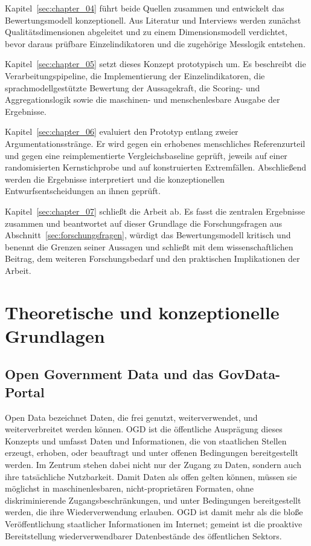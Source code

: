 Kapitel~\ref{sec:chapter_04} führt beide Quellen zusammen und entwickelt das
Bewertungsmodell konzeptionell. Aus Literatur und Interviews werden zunächst
Qualitätsdimensionen abgeleitet und zu einem Dimensionsmodell verdichtet, bevor
daraus prüfbare Einzelindikatoren und die zugehörige Messlogik entstehen.

Kapitel~\ref{sec:chapter_05} setzt dieses Konzept prototypisch um. Es beschreibt
die Verarbeitungspipeline, die Implementierung der Einzelindikatoren, die
sprachmodellgestützte Bewertung der Aussagekraft, die Scoring- und
Aggregationslogik sowie die maschinen- und menschenlesbare Ausgabe der
Ergebnisse.

Kapitel~\ref{sec:chapter_06} evaluiert den Prototyp entlang zweier
Argumentationsstränge. Er wird gegen ein erhobenes menschliches
Referenzurteil und gegen eine reimplementierte Vergleichsbaseline geprüft, jeweils
auf einer randomisierten Kernstichprobe und auf konstruierten Extremfällen.
Abschließend werden die Ergebnisse interpretiert und die konzeptionellen
Entwurfsentscheidungen an ihnen geprüft.

Kapitel~\ref{sec:chapter_07} schließt die Arbeit ab. Es fasst die zentralen
Ergebnisse zusammen und beantwortet auf dieser Grundlage die Forschungsfragen aus
Abschnitt~\ref{sec:forschungsfragen}, würdigt das Bewertungsmodell kritisch und
benennt die Grenzen seiner Aussagen und schließt mit dem wissenschaftlichen
Beitrag, dem weiteren Forschungsbedarf und den praktischen Implikationen der
Arbeit.

\pagebreak
\chapter{Theoretische und konzeptionelle Grundlagen}
\label{sec:chapter_02}

\section{Open Government Data und das GovData-Portal}
\label{sec:govdata_portal}

Open Data bezeichnet Daten, die frei genutzt, weiterverwendet, und weiterverbreitet werden können. \acrfull{OGD} ist die öffentliche Ausprägung dieses Konzepts und umfasst Daten und Informationen, die von staatlichen Stellen erzeugt, erhoben, oder beauftragt und unter offenen Bedingungen bereitgestellt werden. Im Zentrum stehen dabei nicht nur der Zugang zu Daten, sondern auch ihre tatsächliche Nutzbarkeit. Damit Daten als offen gelten können, müssen sie möglichst in maschinenlesbaren, nicht-proprietären Formaten, ohne diskriminierende Zugangsbeschränkungen, und unter Bedingungen bereitgestellt werden, die ihre Wiederverwendung erlauben. OGD ist damit mehr als die bloße Veröffentlichung staatlicher Informationen im Internet; gemeint ist die proaktive Bereitstellung wiederverwendbarer Datenbestände des öffentlichen Sektors. \cite{Ubaldi2013OGD, OECD2020OURdata}

